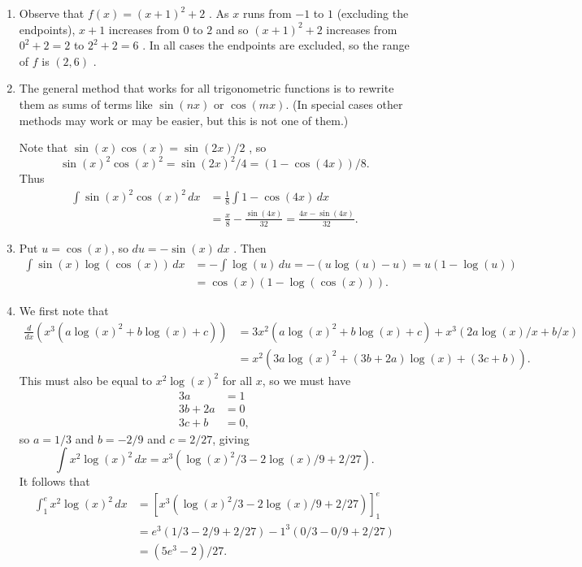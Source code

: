 \documentclass{amsart}
\renewcommand{\:}       {\colon}
\newcommand{\mks}[1]    {}
\newcommand{\mk}        {}
\begin{document}
\renewcommand{\theenumi}{B\arabic{enumi}}

\begin{enumerate}
 \item %
  Observe that $f(x)=(x+1)^2+2$ \mk.  As
  $x$ runs from $-1$ to $1$ (excluding the endpoints), $x+1$ increases
  from $0$ to $2$ and so $(x+1)^2+2$ increases from $0^2+2=2$ to
  $2^2+2=6$ \mks{2}.  In all cases the endpoints are excluded, so the
  range of $f$ is $(2,6)$ \mk.

 \item %
  The general method that works for all trigonometric functions is to
  rewrite them as sums of terms like $\sin(nx)$ or $\cos(mx)$.  (In
  special cases other methods may work or may be easier, but this is
  not one of them.)  

  Note that $\sin(x)\cos(x)=\sin(2x)/2$ \mk, so
  \[ \sin(x)^2\cos(x)^2 = \sin(2x)^2/4 \mk = (1-\cos(4x))/8 \mks{2}.
  \]
  Thus
  \begin{align*}
   \int \sin(x)^2\cos(x)^2\, dx &=
    \tfrac{1}{8} \int 1-\cos(4x)\, dx \mk \\
    &= \frac{x}{8} - \frac{\sin(4x)}{32} = \frac{4x-\sin(4x)}{32} \mks{2}.
  \end{align*}

 \item %
  Put $u=\cos(x)$, so $du=-\sin(x)\,dx$ \mks{2}.  Then
  \begin{align*}
   \int\sin(x)\log(\cos(x))\,dx &= 
    -\int \log(u)\,du \mk = -(u\log(u)-u) \mks{2} = u (1 - \log(u)) \\
    &= \cos(x)(1 - \log(\cos(x))) \mk.
  \end{align*}

 \item %
  We first note that
  \begin{align*}
   \frac{d}{dx}\left(x^3(a\log(x)^2 + b\log(x) + c)\right) 
    &= 3x^2(a\log(x)^2 + b\log(x) + c) + 
       x^3(2a\log(x)/x+b/x)  \mk \\
    &= x^2(3a\log(x)^2 + (3b+2a)\log(x) + (3c+b)). \mk
  \end{align*}
  This must also be equal to $x^2\log(x)^2$ for all $x$, \mk so we must
  have  
  \begin{align*}
   3a &= 1 \\
   3b+2a &= 0 \\
   3c+b &= 0, \mk
  \end{align*}
  so $a=1/3$ and $b=-2/9$ and $c=2/27$,  \mk giving
  \[ \int x^2\log(x)^2\,dx = x^3(\log(x)^2/3-2\log(x)/9+2/27). \]
  It follows that 
  \begin{align*}
   \int_1^e x^2\log(x)^2\, dx &= 
    \left[ x^3(\log(x)^2/3-2\log(x)/9+2/27) \right]_1^e  \mk\\
   &= e^3(1/3-2/9+2/27) - 1^3(0/3-0/9+2/27) \\
   &= (5e^3 - 2)/27. \mk
  \end{align*}


\end{enumerate}
\end{document}
